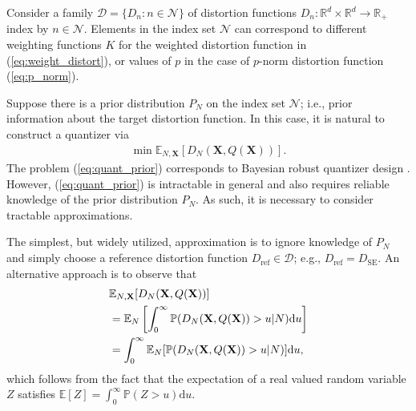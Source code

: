 \documentclass[journal]{IEEEtran}
\begin{document}
Consider a family $\mathcal{D} = \{D_n: n \in \mathcal{N}\}$ of distortion functions $D_n: \mathbb{R}^d \times \mathbb{R}^d \rightarrow \mathbb{R}_+$ index by $n \in \mathcal{N}$. Elements in the index set $\mathcal{N}$ can correspond to different weighting functions $K$ for the weighted distortion function in (\ref{eq:weight_distort}), or values of $p$ in the case of $p$-norm distortion function (\ref{eq:p_norm}). 

Suppose there is a prior distribution $P_N$ on the index set $\mathcal{N}$; i.e., prior information about the target distortion function. In this case, it is natural to construct a quantizer via
\begin{align}\label{eq:quant_prior}
	\min \mathbb{E}_{N,\mathbf{X}}[D_N(\mathbf{X},Q(\mathbf{X}))].
\end{align}
The problem (\ref{eq:quant_prior}) corresponds to Bayesian robust quantizer design \cite{Vempaty2014quantizer}. However, (\ref{eq:quant_prior}) is intractable in general and also requires reliable knowledge of the prior distribution $P_N$. As such, it is necessary to consider tractable approximations. 

The simplest, but widely utilized, approximation is to ignore knowledge of $P_N$ and simply choose a reference distortion function $D_{\mathrm{ref}} \in \mathcal{D}$; e.g., $D_{\mathrm{ref}} = D_{\mathrm{SE}}$. An alternative approach is to observe that 
\begin{align}
	&\mathbb{E}_{N,\mathbf{X}}[D_N(\mathbf{X},Q(\mathbf{X}))]\notag\\
	&= \mathbb{E}_N\left[\int_0^{\infty} \mathbb{P}(D_N(\mathbf{X},Q(\mathbf{X})) > u|N)\mathrm{d}u\right]\notag\\
	&= \int_0^{\infty} \mathbb{E}_N[\mathbb{P}(D_N(\mathbf{X},Q(\mathbf{X})) > u|N)]\mathrm{d}u,
\end{align}
which follows from the fact that the expectation of a real valued random variable $Z$ satisfies $\mathbb{E}[Z] = \int_0^{\infty} \mathbb{P}(Z > u)\mathrm{d}u$. 
\end{document}
